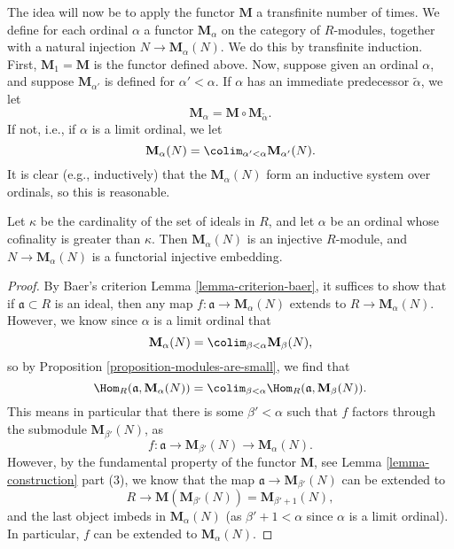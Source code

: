 \noindent
The idea will now be to apply the functor $\mathbf{M}$ a transfinite number
of times. We define for each ordinal $\alpha$ a functor $\mathbf{M}_\alpha$
on the category of $R$-modules, together with a natural injection $N \to
\mathbf{M}_\alpha(N)$. We do this by transfinite induction.
First, $\mathbf{M}_1 = \mathbf{M}$ is the functor defined above.
Now, suppose given an ordinal $\alpha$, and suppose $\mathbf{M}_{\alpha'}$
is defined for $\alpha' < \alpha$. If $\alpha$ has an immediate predecessor
$\widetilde{\alpha}$, we let
$$
\mathbf{M}_\alpha = \mathbf{M} \circ \mathbf{M}_{\widetilde{\alpha}}.
$$
If not, i.e., if $\alpha$ is a limit ordinal, we let
$$
\mathbf{M}_{\alpha}(N) =
\colim_{\alpha' < \alpha} \mathbf{M}_{\alpha'}(N).
$$
It is clear (e.g., inductively) that the $\mathbf{M}_{\alpha}(N)$
form an inductive system over ordinals, so this is reasonable.

\begin{theorem}
\label{theorem-baer-grothendieck}
Let $\kappa$ be the cardinality of the set of ideals in $R$, and
let $\alpha$ be an ordinal whose cofinality is greater than
$\kappa$. Then $\mathbf{M}_\alpha(N)$ is an injective $R$-module,
and $N \to \mathbf{M}_\alpha(N)$ is a functorial injective embedding.
\end{theorem}

\begin{proof}
By Baer's criterion
Lemma \ref{lemma-criterion-baer},
it suffices to show that if $\mathfrak{a} \subset R$ is an ideal, then
any map $f : \mathfrak{a} \to \mathbf{M}_\alpha(N)$ extends to
$R \to \mathbf{M}_\alpha(N)$. However, we know since $\alpha$ is a limit
ordinal that
$$
\mathbf{M}_{\alpha}(N) =
\colim_{\beta < \alpha} \mathbf{M}_{\beta}(N),
$$
so by
Proposition \ref{proposition-modules-are-small},
we find that
$$
\Hom_R(\mathfrak{a}, \mathbf{M}_{\alpha}(N)) =
\colim_{\beta < \alpha} \Hom_R(\mathfrak a, \mathbf{M}_{\beta}(N)).
$$
This means in particular that there is some $\beta' < \alpha$
such that $f$ factors through the submodule $\mathbf{M}_{\beta'}(N)$, as
$$
f : \mathfrak{a} \to \mathbf{M}_{\beta'}(N) \to
\mathbf{M}_{\alpha}(N).
$$
However, by the fundamental property of the functor $\mathbf{M}$,
see Lemma \ref{lemma-construction} part (3),
we know that the map $\mathfrak{a} \to \mathbf{M}_{\beta'}(N)$
can be extended to
$$
R \to \mathbf{M}( \mathbf{M}_{\beta'}(N)) =
\mathbf{M}_{\beta' + 1}(N),
$$
and the last object imbeds in $\mathbf{M}_{\alpha}(N)$ (as
$\beta' + 1 < \alpha$ since $\alpha$ is a limit ordinal).
In particular, $f$ can be extended to $\mathbf{M}_{\alpha}(N)$.
\end{proof}




